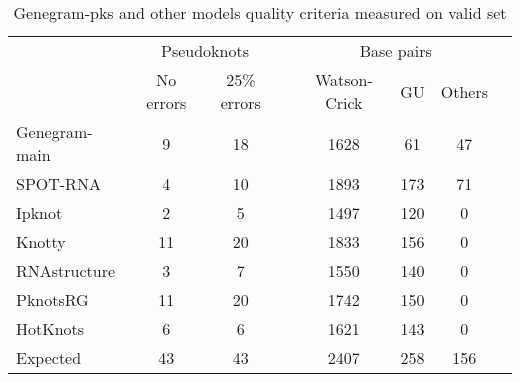 \begin{table}[h!]
\centering
\caption{Genegram-pks and other models quality criteria measured on valid set}
\begin{tabular}{@{}lccccccc@{}}\toprule
& \multicolumn{2}{c}{Pseudoknots} & \phantom{abc}& \multicolumn{3}{c}{Base pairs} \\
& No errors & 25\% errors  && Watson-Crick & GU & Others \\ \cmidrule{2-3} \cmidrule{5-7} 
Genegram-main  & 9 & 18 && 1628 & 61 & 47 \\
SPOT-RNA & 4 & 10 && 1893 & 173 & 71 \\
Ipknot & 2 & 5 && 1497 & 120 & 0 \\
Knotty & 11 & 20 && 1833 & 156 & 0 \\
RNAstructure & 3 & 7 && 1550 & 140 & 0 \\
PknotsRG & 11 & 20 && 1742 & 150 & 0 \\
HotKnots & 6 & 6 && 1621 & 143 & 0 \\
\bottomrule
Expected & 43 & 43 && 2407 & 258 & 156 \\
\bottomrule
\end{tabular}
\label{table_pks}
\end{table}